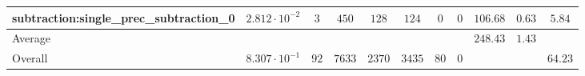 \begin{tabular}{|l|c|c|c|c|c|c|c|c|c|c|}
subtraction:single\_prec\_subtraction\_0         & $ 2.812 \cdot 10^{-2} $ & $ 3      $ & $ 450  $ & $ 128  $ & $ 124   $ & $ 0  $ & $ 0 $ & $ 106.68      $ & $ 0.63    $ & $ 5.84    $ \\
\hline
Average                                          & $                     $ & $        $ & $      $ & $      $ & $       $ & $    $ & $   $ & $ 248.43      $ & $ 1.43    $ & $         $ \\
\hline
Overall                                          & $ 8.307 \cdot 10^{-1} $ & $ 92     $ & $ 7633 $ & $ 2370 $ & $ 3435  $ & $ 80 $ & $ 0 $ & $             $ & $         $ & $ 64.23   $ \\
\hline
\end{tabular}
